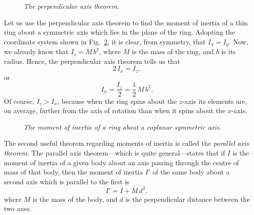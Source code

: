 \begin{figure}
\epsfysize=2in
\centerline{}
\caption{\em The perpendicular axis theorem.}\label{f77}  
\end{figure}

Let us use the perpendicular axis theorem to find the moment of inertia of a thin ring about
a symmetric axis which lies in the plane of the ring. Adopting the coordinate system shown in
Fig.~\ref{f78}, it is clear, from symmetry, that $I_x=I_y$. 
Now, we already know that $I_z=M\,b^2$,
where $M$ is the mass of the ring, and $b$ is its radius. Hence, the perpendicular axis
theorem tells us that
\begin{equation}
2\,I_x = I_z,
\end{equation}
or
\begin{equation}
I_x = \frac{I_z}{2} = \frac{1}{2}\,M\,b^2.
\end{equation}
Of course, $I_z>I_x$, because when the ring spins about the $z$-axis its elements are, on average,
farther from the axis of rotation than when it spins about the $x$-axis.

\begin{figure}
\epsfysize=2in
\centerline{}
\caption{\em The moment of inertia of a ring about a coplanar symmetric axis.}\label{f78}  
\end{figure}

The second useful theorem regarding moments of inertia is called the {\em parallel
axis theorem}. The parallel axis theorem---which is quite general---states that if $I$
is the moment of inertia of a given body about an axis passing through the centre of mass
of that body, then the moment of inertia $I'$ of the same body about a second axis
which is parallel to the first is
\begin{equation}
I' = I + M\,d^2,
\end{equation}
where $M$ is the mass of the body, and $d$ is the perpendicular distance between the
two axes. 

